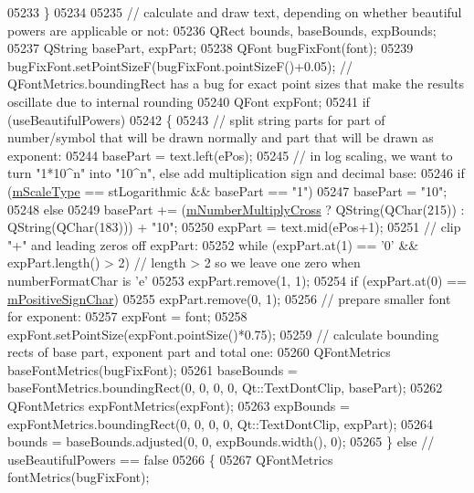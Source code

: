 \begin{DoxyCode}
05233   \}
05234   
05235   \textcolor{comment}{// calculate and draw text, depending on whether beautiful powers are applicable or not:}
05236   QRect bounds, baseBounds, expBounds;
05237   QString basePart, expPart;
05238   QFont bugFixFont(font);
05239   bugFixFont.setPointSizeF(bugFixFont.pointSizeF()+0.05); \textcolor{comment}{// QFontMetrics.boundingRect has a bug for exact
       point sizes that make the results oscillate due to internal rounding }
05240   QFont expFont;
05241   \textcolor{keywordflow}{if} (useBeautifulPowers)
05242   \{
05243     \textcolor{comment}{// split string parts for part of number/symbol that will be drawn normally and part that will be drawn
       as exponent:}
05244     basePart = text.left(ePos);
05245     \textcolor{comment}{// in log scaling, we want to turn "1*10^n" into "10^n", else add multiplication sign and decimal base:}
05246     \textcolor{keywordflow}{if} (\hyperlink{a00025_ad706039549cbbbec5fcb2baf7894e04d}{mScaleType} == stLogarithmic && basePart == \textcolor{stringliteral}{"1"})
05247       basePart = \textcolor{stringliteral}{"10"};
05248     \textcolor{keywordflow}{else}
05249       basePart += (\hyperlink{a00025_aebf0367d8645d2e05b93a0952b7e805b}{mNumberMultiplyCross} ? QString(QChar(215)) : QString(QChar(183))) + \textcolor{stringliteral}{
      "10"};
05250     expPart = text.mid(ePos+1);
05251     \textcolor{comment}{// clip "+" and leading zeros off expPart:}
05252     \textcolor{keywordflow}{while} (expPart.at(1) == \textcolor{charliteral}{'0'} && expPart.length() > 2) \textcolor{comment}{// length > 2 so we leave one zero when
       numberFormatChar is 'e'}
05253       expPart.remove(1, 1);
05254     \textcolor{keywordflow}{if} (expPart.at(0) == \hyperlink{a00025_ae99d47103ec8ba66959205b23991241b}{mPositiveSignChar})
05255       expPart.remove(0, 1);
05256     \textcolor{comment}{// prepare smaller font for exponent:}
05257     expFont = font;
05258     expFont.setPointSize(expFont.pointSize()*0.75);
05259     \textcolor{comment}{// calculate bounding rects of base part, exponent part and total one:}
05260     QFontMetrics baseFontMetrics(bugFixFont);
05261     baseBounds = baseFontMetrics.boundingRect(0, 0, 0, 0, Qt::TextDontClip, basePart);
05262     QFontMetrics expFontMetrics(expFont);
05263     expBounds = expFontMetrics.boundingRect(0, 0, 0, 0, Qt::TextDontClip, expPart);
05264     bounds = baseBounds.adjusted(0, 0, expBounds.width(), 0); 
05265   \} \textcolor{keywordflow}{else} \textcolor{comment}{// useBeautifulPowers == false}
05266   \{
05267     QFontMetrics fontMetrics(bugFixFont);

\end{DoxyCode}
